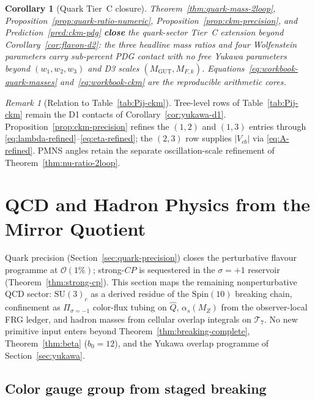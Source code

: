 \documentclass[aps,prd,onecolumn,amsmath,amssymb,nofootinbib,11pt]{revtex4-2}
\numberwithin{equation}{section}
\theoremstyle{plain}
\newtheorem{corollary}[theorem]{Corollary}
\theoremstyle{definition}
\theoremstyle{remark}
\newtheorem{remark}[theorem]{Remark}
\newcommand{\Spin}{\mathrm{Spin}}
\begin{document}
\begin{corollary}[Quark Tier~C closure]\label{cor:quark-tier-c}
Theorem~\ref{thm:quark-mass-2loop}, Proposition~\ref{prop:quark-ratio-numeric},
Proposition~\ref{prop:ckm-precision}, and Prediction~\ref{pred:ckm-pdg}
\textbf{close} the quark-sector Tier~C extension beyond
Corollary~\ref{cor:flavon-d2}: the three headline mass ratios and four
Wolfenstein parameters carry sub-percent PDG contact with no free Yukawa
parameters beyond $(w_1,w_2,w_3)$ and D3 scales
$(M_{\mathrm{GUT}},M_{F,k})$. Equations~\eqref{eq:workbook-quark-masses}
and~\eqref{eq:workbook-ckm} are the reproducible arithmetic cores.
\end{corollary}

\begin{remark}[Relation to Table~\ref{tab:Pij-ckm}]
Tree-level rows of Table~\ref{tab:Pij-ckm} remain the D1 contacts of
Corollary~\ref{cor:yukawa-d1}. Proposition~\ref{prop:ckm-precision}
refines the $(1,2)$ and $(1,3)$ entries through
\eqref{eq:lambda-refined}--\eqref{eq:eta-refined}; the $(2,3)$ row
supplies $|V_{cb}|$ via \eqref{eq:A-refined}. PMNS angles retain the
separate oscillation-scale refinement of Theorem~\ref{thm:nu-ratio-2loop}.
\end{remark}%
\section{QCD and Hadron Physics from the Mirror Quotient}
\label{sec:qcd}

Quark precision (Section~\ref{sec:quark-precision}) closes the perturbative
flavour programme at $\mathcal{O}(1\%)$; strong-$CP$ is sequestered in the
$\sigma=+1$ reservoir (Theorem~\ref{thm:strong-cp}). This section maps the
remaining nonperturbative QCD sector: $\mathrm{SU}(3)_c$ as a derived residue
of the $\Spin(10)$ breaking chain, confinement as $\Pi_{\sigma=-1}$ color-flux
tubing on $\hat Q$, $\alpha_s(M_Z)$ from the observer-local FRG ledger, and
hadron masses from cellular overlap integrals on $\mathcal{T}_7$. No new
primitive input enters beyond Theorem~\ref{thm:breaking-complete},
Theorem~\ref{thm:beta} ($b_0=12$), and the Yukawa overlap programme of
Section~\ref{sec:yukawa}.

\subsection{Color gauge group from staged breaking}
\label{sec:qcd:derived}
\end{document}

